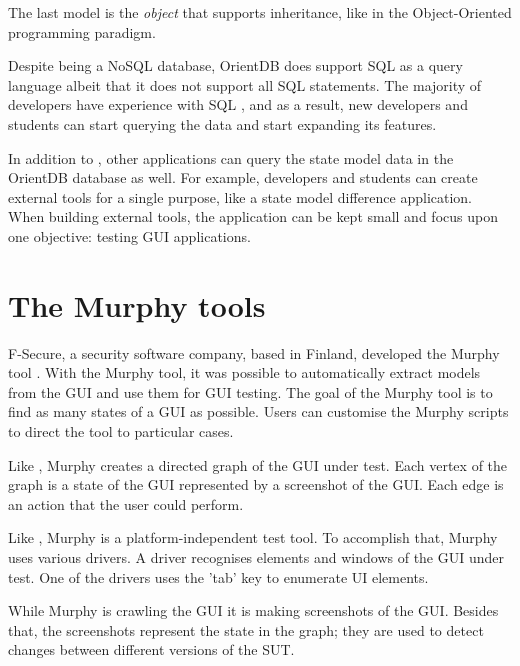 The last model is the \hypertarget{db:object}{\emph{object}} that supports inheritance, like in the Object-Oriented programming paradigm.\par

Despite being a NoSQL database, OrientDB does support SQL as a query language \cite{sql-lang} albeit that it does not support all SQL statements. The majority of developers have experience with SQL \cite{sql-stats}, and as a result, new developers and students can start querying the \testar data and start expanding its features.\par

In addition to \testar, other applications can query the state model data in the OrientDB database as well. For example, developers and students can create external tools for a single purpose, like a state model difference application. When building external tools, the \testar application can be kept small and focus upon one objective: testing GUI applications. 

\section{The Murphy tools} \label{murphy-tools}


F-Secure, a security software company, based in Finland, developed the Murphy tool \cite{aho2013industrial}. With the Murphy tool, it was possible to automatically extract models from the GUI and use them for GUI testing. The goal of the Murphy tool is to find as many states of a GUI as possible. Users can customise the Murphy scripts to direct the tool to particular cases. 

Like \testar, Murphy creates a directed graph of the GUI under test. Each vertex of the graph is a state of the GUI represented by a screenshot of the GUI. Each edge is an action that the user could perform. 

Like \testar, Murphy is a platform-independent test tool. To accomplish that, Murphy uses various drivers. A driver recognises elements and windows of the GUI under test. One of the drivers uses the 'tab' key to enumerate UI elements. 

While Murphy is crawling the GUI it is making screenshots of the GUI. Besides that, the screenshots represent the state in the graph; they are used to detect changes between different versions of the SUT. 

